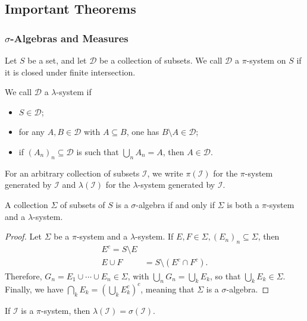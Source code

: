 \documentclass[10pt]{mypackage}
\begin{document}
\subsection{Important Theorems}%
\subsubsection{$\sigma$-Algebras and Measures}%
\begin{definition}
  Let $S$ be a set, and let $\mathcal{D}$ be a collection of subsets. We call $ \mathcal{D} $ a $\pi$-system on $S$ if it is closed under finite intersection.

  We call $\mathcal{D}$ a $\lambda$-system if
  \begin{itemize}
    \item $S\in \mathcal{D}$;
    \item for any $A,B\in \mathcal{D}$ with $A\subseteq B$, one has $B\setminus A\in \mathcal{D}$;
    \item if $\left( A_n \right)_n\subseteq \mathcal{D}$ is such that $\bigcup_n A_n = A$, then $A\in \mathcal{D}$.
  \end{itemize}
  For an arbitrary collection of subsets $\mathcal{I}$, we write $\pi\left( \mathcal{I} \right)$ for the $\pi$-system generated by $ \mathcal{I} $ and $\lambda\left( \mathcal{I} \right)$ for the $\lambda$-system generated by $ \mathcal{I} $.
\end{definition}
\begin{proposition}
  A collection $\Sigma$ of subsets of $S$ is a $\sigma$-algebra if and only if $\Sigma$ is both a $\pi$-system and a $\lambda$-system.
\end{proposition}
\begin{proof}
  Let $\Sigma$ be a $\pi$-system and a $\lambda$-system. If $E,F\in \Sigma, \left( E_n \right)_n\subseteq \Sigma$, then 
  \begin{align*}
    E^{c} = S\setminus E\\
    E\cup F &= S\setminus \left( E^{c}\cap F^{c} \right).
  \end{align*}
  Therefore, $G_n = E_1\cup\cdots\cup E_n\in \Sigma$, with $\bigcup_n G_n = \bigcup_k E_k$, so that $\bigcup_{k} E_k\in \Sigma$. Finally, we have $\bigcap_{k} E_k = \left( \bigcup_{k}E_k^{c} \right)^{c}$, meaning that $\Sigma$ is a $\sigma$-algebra.
\end{proof}
\begin{theorem}
  If $ \mathcal{I} $ is a $\pi$-system, then $\lambda\left( \mathcal{I} \right) = \sigma\left( \mathcal{I} \right)$.
\end{theorem}
\end{document}
